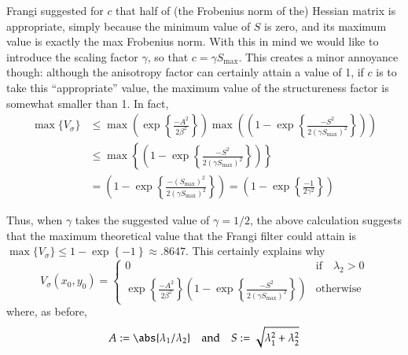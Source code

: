     Frangi suggested for $c$ that half of (the Frobenius norm of the) Hessian matrix is appropriate, simply because the minimum value of $S$ is zero, and its maximum value is exactly the max Frobenius norm. With this in mind we would like to introduce the scaling factor
    $\gamma$, so that $ c = \gamma S_{\max}$. This creates a minor annoyance though: although the anisotropy factor can certainly attain a value of 1, if $c$ is to take this ``appropriate'' value, the maximum value of the structureness factor is somewhat smaller than 1. In fact,
    \begin{equation}
    \begin{aligned}
    \max\{V_\sigma\} &\le \max\left(
                                    \exp\left\{\frac{-A^2}{2\beta^2}\right\}
                            \right)
                        \max\left(
                            \left(1 - \exp\left\{\frac{-S^2}{2(\gamma S_{\max})^2}\right\}\right)
                            \right) \\
                    &\le \max\left\{
                    \left(1 - \exp\left\{\frac{-S^2}{2(\gamma S_{\max})^2}\right\}\right)
                    \right\} \\
                    &= 
                    \left(1 - \exp\left\{\frac{-(S_{\max})^2}{2(\gamma S_{\max})^2}\right\}
                    \right)
                    = \left(1 - \exp\left\{\frac{-1}{2\gamma^2}\right\}
                    \right)
    \end{aligned}
    \end{equation}
    
    Thus, when $\gamma$ takes the suggested value of $\gamma = 1/2$, the above calculation suggests that
    the maximum theoretical value that the Frangi filter could attain is
    $ \max \{ V_\sigma \} \le 1 - \exp\left\{ -1 \right\} \approx .8647$.
    This certainly explains why 
    \begin{equation} \label{eq:frangi-vesselness-measure-v1}
    V_\sigma(x_0,y_0) = \begin{cases}
    0 & \text{if} \quad \lambda_2 > 0 \\
    \exp\left\{\frac{-A^2}{2\beta^2}\right\}
    \left(1 - \exp\left\{\frac{-S^2}{2(\gamma S_{\max})^2}\right\}\right) & \text{otherwise}
    \end{cases} \end{equation}
    where, as before, 
    \begin{equation} \label{frangi-def-anisotropy-structureness-v1}
    A := \abs{\lambda_1 / \lambda_2}
    \quad \textrm{and} \quad 
    S := \sqrt{\lambda_1^2 + \lambda_2^2}
    \end{equation}
    

